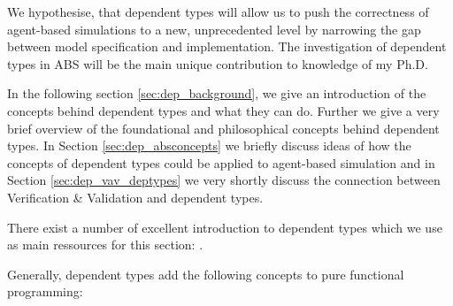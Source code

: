 We hypothesise, that  dependent types will allow us to push the correctness of agent-based simulations to a new, unprecedented level by narrowing the gap between model specification and implementation. The investigation of dependent types in ABS will be the main unique contribution to knowledge of my Ph.D.

In the following section \ref{sec:dep_background}, we give an introduction of the concepts behind dependent types and what they can do. Further we give a very brief overview of the foundational and philosophical concepts behind dependent types. In Section \ref{sec:dep_absconcepts} we briefly discuss ideas of how the concepts of dependent types could be applied to agent-based simulation and in Section \ref{sec:dep_vav_deptypes} we very shortly discuss the connection between Verification \& Validation and dependent types.

There exist a number of excellent introduction to dependent types which we use as main ressources for this section: \cite{thompson_type_1991, program_homotopy_2013, stump_verified_2016, brady_type-driven_2017, pierce_programming_2018}.

Generally, dependent types add the following concepts to pure functional programming:

